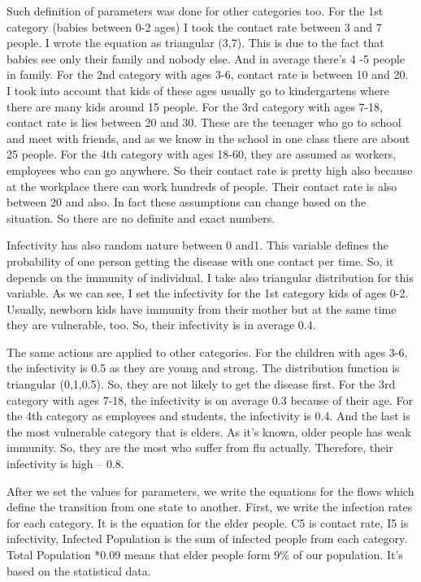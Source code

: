 Such definition of parameters was done for other categories too. For the 1st category (babies between 0-2 ages) I took the contact rate between 3 and 7 people. I wrote the equation as triangular (3,7). This is due to the fact that babies see only their family and nobody else. And in average there’s 4 -5 people in family. For the 2nd category with ages 3-6, contact rate is between 10 and 20. I took into account that kids of these ages usually go to kindergartens where there are many kids around 15 people. For the 3rd category with ages 7-18, contact rate is lies between 20 and 30. These are the teenager who go to school and meet with friends, and as we know in the school in one class there are about 25 people. For the 4th category with ages 18-60, they are assumed as workers, employees who can go anywhere. So their contact rate is pretty high also because at the workplace there can work hundreds of people. Their contact rate is also between 20 and also. In fact these assumptions can change based on the situation. So there are no definite and exact numbers.

Infectivity has also random nature between 0 and1. This variable defines the probability of one person getting the disease with one contact per time. So, it depends on the immunity of individual. I take also triangular distribution for this variable. As we can see, I set the infectivity for the 1st category kids of ages 0-2. Usually, newborn kids have immunity from their mother but at the same time they are vulnerable, too. So, their infectivity is in average 0.4.

The same actions are applied to other categories. For the children with ages 3-6, the infectivity is 0.5 as they are young and strong. The distribution function is triangular (0,1,0.5). So, they are not likely to get the disease first. For the 3rd category with ages 7-18, the infectivity is on average 0.3 because of their age. For the 4th category as employees and students, the infectivity is 0.4. And the last is the most vulnerable category that is elders. As it’s known, older people has weak immunity. So, they are the most who suffer from flu actually. Therefore, their infectivity is high – 0.8.

After we set the values for parameters, we write the equations for the flows which define the transition from one state to another. First, we write the infection rates for each category. It is the equation for the elder people. C5 is contact rate, I5 is infectivity, Infected Population is the sum of infected people from each category.  Total Population *0.09 means that elder people form 9\% of our population. It’s based on the statistical data.

